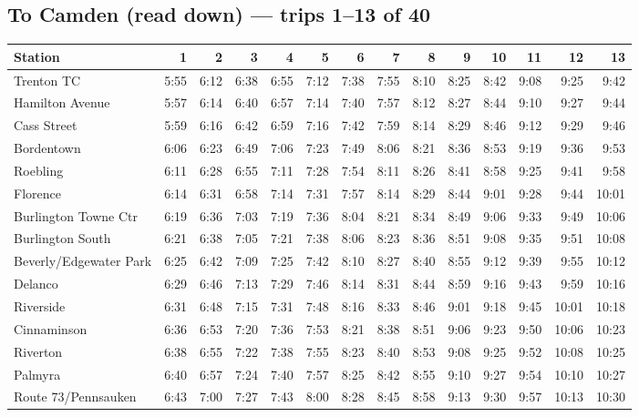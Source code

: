 \subsection*{To Camden (read down) --- trips 1--13 of 40}
\begin{center}\footnotesize\setlength{\tabcolsep}{3pt}\begin{tabular}{@{}lrrrrrrrrrrrrr@{}}\toprule
Station & 1 & 2 & 3 & 4 & 5 & 6 & 7 & 8 & 9 & 10 & 11 & 12 & 13 \\\midrule
Trenton TC & 5:55 & 6:12 & 6:38 & 6:55 & 7:12 & 7:38 & 7:55 & 8:10 & 8:25 & 8:42 & 9:08 & 9:25 & 9:42 \\
Hamilton Avenue & 5:57 & 6:14 & 6:40 & 6:57 & 7:14 & 7:40 & 7:57 & 8:12 & 8:27 & 8:44 & 9:10 & 9:27 & 9:44 \\
Cass Street & 5:59 & 6:16 & 6:42 & 6:59 & 7:16 & 7:42 & 7:59 & 8:14 & 8:29 & 8:46 & 9:12 & 9:29 & 9:46 \\
Bordentown & 6:06 & 6:23 & 6:49 & 7:06 & 7:23 & 7:49 & 8:06 & 8:21 & 8:36 & 8:53 & 9:19 & 9:36 & 9:53 \\
Roebling & 6:11 & 6:28 & 6:55 & 7:11 & 7:28 & 7:54 & 8:11 & 8:26 & 8:41 & 8:58 & 9:25 & 9:41 & 9:58 \\
Florence & 6:14 & 6:31 & 6:58 & 7:14 & 7:31 & 7:57 & 8:14 & 8:29 & 8:44 & 9:01 & 9:28 & 9:44 & 10:01 \\
Burlington Towne Ctr & 6:19 & 6:36 & 7:03 & 7:19 & 7:36 & 8:04 & 8:21 & 8:34 & 8:49 & 9:06 & 9:33 & 9:49 & 10:06 \\
Burlington South & 6:21 & 6:38 & 7:05 & 7:21 & 7:38 & 8:06 & 8:23 & 8:36 & 8:51 & 9:08 & 9:35 & 9:51 & 10:08 \\
Beverly/Edgewater Park & 6:25 & 6:42 & 7:09 & 7:25 & 7:42 & 8:10 & 8:27 & 8:40 & 8:55 & 9:12 & 9:39 & 9:55 & 10:12 \\
Delanco & 6:29 & 6:46 & 7:13 & 7:29 & 7:46 & 8:14 & 8:31 & 8:44 & 8:59 & 9:16 & 9:43 & 9:59 & 10:16 \\
Riverside & 6:31 & 6:48 & 7:15 & 7:31 & 7:48 & 8:16 & 8:33 & 8:46 & 9:01 & 9:18 & 9:45 & 10:01 & 10:18 \\
Cinnaminson & 6:36 & 6:53 & 7:20 & 7:36 & 7:53 & 8:21 & 8:38 & 8:51 & 9:06 & 9:23 & 9:50 & 10:06 & 10:23 \\
Riverton & 6:38 & 6:55 & 7:22 & 7:38 & 7:55 & 8:23 & 8:40 & 8:53 & 9:08 & 9:25 & 9:52 & 10:08 & 10:25 \\
Palmyra & 6:40 & 6:57 & 7:24 & 7:40 & 7:57 & 8:25 & 8:42 & 8:55 & 9:10 & 9:27 & 9:54 & 10:10 & 10:27 \\
Route 73/Pennsauken & 6:43 & 7:00 & 7:27 & 7:43 & 8:00 & 8:28 & 8:45 & 8:58 & 9:13 & 9:30 & 9:57 & 10:13 & 10:30 \\

\end{tabular}
\end{center}

